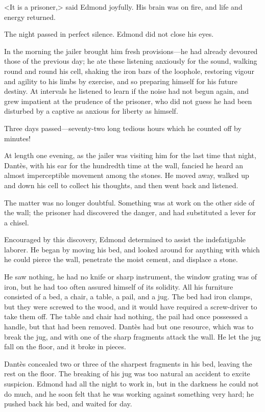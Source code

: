  <It is a prisoner,> said Edmond joyfully. His brain was on fire, and life and energy returned. 

 The night passed in perfect silence. Edmond did not close his eyes. 

 In the morning the jailer brought him fresh provisions—he had already devoured those of the previous day; he ate these listening anxiously for the sound, walking round and round his cell, shaking the iron bars of the loophole, restoring vigour and agility to his limbs by exercise, and so preparing himself for his future destiny. At intervals he listened to learn if the noise had not begun again, and grew impatient at the prudence of the prisoner, who did not guess he had been disturbed by a captive as anxious for liberty as himself. 

 Three days passed—seventy-two long tedious hours which he counted off by minutes! 

 At length one evening, as the jailer was visiting him for the last time that night, Dantès, with his ear for the hundredth time at the wall, fancied he heard an almost imperceptible movement among the stones. He moved away, walked up and down his cell to collect his thoughts, and then went back and listened. 

 The matter was no longer doubtful. Something was at work on the other side of the wall; the prisoner had discovered the danger, and had substituted a lever for a chisel. 

 Encouraged by this discovery, Edmond determined to assist the indefatigable laborer. He began by moving his bed, and looked around for anything with which he could pierce the wall, penetrate the moist cement, and displace a stone. 

 He saw nothing, he had no knife or sharp instrument, the window grating was of iron, but he had too often assured himself of its solidity. All his furniture consisted of a bed, a chair, a table, a pail, and a jug. The bed had iron clamps, but they were screwed to the wood, and it would have required a screw-driver to take them off. The table and chair had nothing, the pail had once possessed a handle, but that had been removed.  Dantès had but one resource, which was to break the jug, and with one of the sharp fragments attack the wall. He let the jug fall on the floor, and it broke in pieces. 

 Dantès concealed two or three of the sharpest fragments in his bed, leaving the rest on the floor. The breaking of his jug was too natural an accident to excite suspicion. Edmond had all the night to work in, but in the darkness he could not do much, and he soon felt that he was working against something very hard; he pushed back his bed, and waited for day. 

